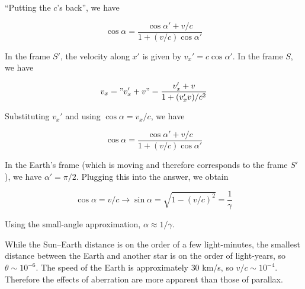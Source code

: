 \documentclass[11pt]{article}
\begin{document}
\begin{pproblem}
\begin{pssolution*}{}{}
\begin{alternativas}
            ``Putting the \(c\)'s back'', we have

            \[\boxed{\cos\alpha = \frac{\cos\alpha' + v/c}{1+(v/c)\cos\alpha'}}\]


            \item In the frame \(S'\), the velocity along \(x'\) is given by \(v_x' = c\cos\alpha'\). In the frame \(S\), we have
            
            \[v_x = "v_x'+v" = \frac{v_x'+v}{1+(v_x'v)/c^2}\]

            Substituting \(v_x'\) and using \(\cos\alpha = v_x/c\), we have

            \[\boxed{\cos\alpha =\frac{\cos\alpha' + v/c}{1+(v/c)\cos\alpha'}} \]

            \item In the Earth's frame (which is moving and therefore corresponds to the frame \(S'\)), we have \(\alpha' = \pi/2\). Plugging this into the answer, we obtain
            
            \[\cos\alpha = v/c \rightarrow \sin\alpha = \sqrt{1-(v/c)^2} = \frac{1}{\gamma}\]

            Using the small-angle approximation, \(\boxed{\alpha \approx 1/\gamma}\).

            \item While the Sun--Earth distance is on the order of a few light-minutes, the smallest distance between the Earth and another star is on the order of light-years, so \(\theta \sim 10^{-6}\). The speed of the Earth is approximately \(30\) km/s, so \(v/c \sim 10^{-4}\). Therefore the effects of aberration are more apparent than those of parallax.


        \end{alternativas}

        \end{pssolution*}

\end{pproblem}
\end{document}
